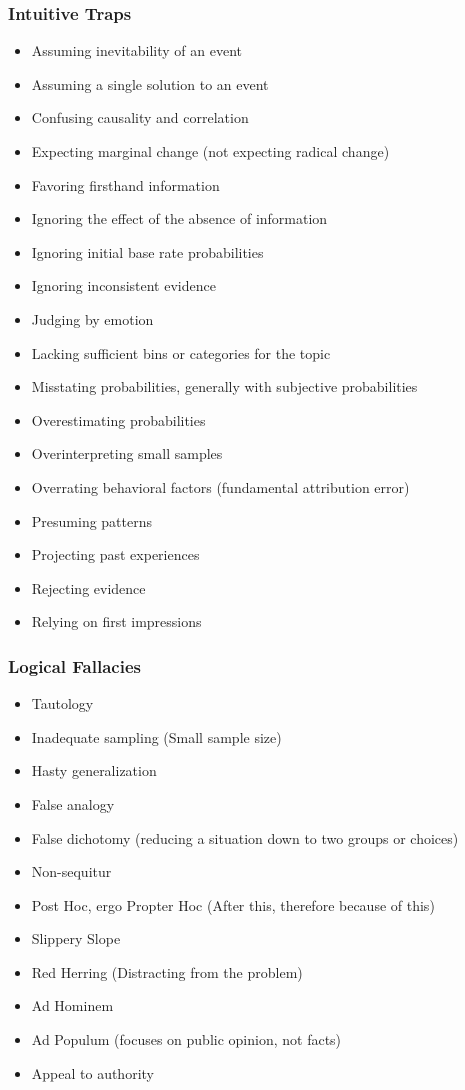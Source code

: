 \documentclass[11pt]{article}
\begin{document}
\subsubsection{Intuitive Traps}
\label{sec:org6611c12}
\begin{itemize}
\item Assuming inevitability of an event
\item Assuming a single solution to an event
\item Confusing causality and correlation
\item Expecting marginal change (not expecting radical change)
\item Favoring firsthand information
\item Ignoring the effect of the absence of information
\item Ignoring initial base rate probabilities
\item Ignoring inconsistent evidence
\item Judging by emotion
\item Lacking sufficient bins or categories for the topic
\item Misstating probabilities, generally with subjective probabilities
\item Overestimating probabilities
\item Overinterpreting small samples
\item Overrating behavioral factors (fundamental attribution error)
\item Presuming patterns
\item Projecting past experiences
\item Rejecting evidence
\item Relying on first impressions
\end{itemize}
\subsubsection{Logical Fallacies}
\label{sec:org8a80778}
\begin{itemize}
\item Tautology
\item Inadequate sampling (Small sample size)
\item Hasty generalization
\item False analogy
\item False dichotomy  (reducing a situation down to two groups or choices)
\item Non-sequitur
\item Post Hoc, ergo Propter Hoc (After this, therefore because of this)
\item Slippery Slope
\item Red Herring (Distracting from the problem)
\item Ad Hominem
\item Ad Populum (focuses on public opinion, not facts)
\item Appeal to authority
\end{itemize}
\end{document}
